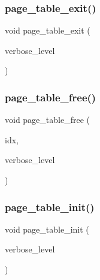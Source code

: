 \subsubsection{\texorpdfstring{page\+\_\+table\+\_\+exit()}{page\_table\_exit()}}
{\footnotesize\ttfamily void page\+\_\+table\+\_\+exit (\begin{DoxyParamCaption}\item[{\mbox{\hyperlink{galois_8h_a09fddde158a3a20bd2dcadb609de11dc}{I\+NT}}}]{verbose\+\_\+level }\end{DoxyParamCaption})}

\mbox{\label{page__table_8_c_af9680c039a4c1b0deaf6446ea45882e4}} 
\subsubsection{\texorpdfstring{page\+\_\+table\+\_\+free()}{page\_table\_free()}}
{\footnotesize\ttfamily void page\+\_\+table\+\_\+free (\begin{DoxyParamCaption}\item[{\mbox{\hyperlink{galois_8h_a09fddde158a3a20bd2dcadb609de11dc}{I\+NT}}}]{idx,  }\item[{\mbox{\hyperlink{galois_8h_a09fddde158a3a20bd2dcadb609de11dc}{I\+NT}}}]{verbose\+\_\+level }\end{DoxyParamCaption})}

\mbox{\label{page__table_8_c_ab1c17c254db929b1c70f13c60f3efbbe}} 
\subsubsection{\texorpdfstring{page\+\_\+table\+\_\+init()}{page\_table\_init()}}
{\footnotesize\ttfamily void page\+\_\+table\+\_\+init (\begin{DoxyParamCaption}\item[{\mbox{\hyperlink{galois_8h_a09fddde158a3a20bd2dcadb609de11dc}{I\+NT}}}]{verbose\+\_\+level }\end{DoxyParamCaption})}

